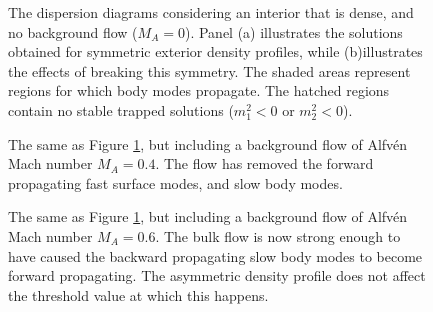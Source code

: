 \documentclass[12pt]{ociamthesis}
\begin{document}
\begin{figure}[t]
\centering
{}
\caption{The dispersion diagrams considering an interior that is dense, and no background flow ($M_A = 0$).
Panel (a) illustrates the solutions obtained for symmetric exterior density profiles, while (b)illustrates the effects of breaking this symmetry.
The shaded areas represent regions for which body modes propagate.
The hatched regions contain no stable trapped solutions ($m_1^2 < 0$ or $m_2^2 < 0$).}
\label{fig:dense0}
\end{figure}

\begin{figure}[t]
\centering
{}
\caption{The same as Figure \ref{fig:dense0}, but including a background flow of Alfv\'en Mach number $M_A = 0.4$.
The flow has removed the forward propagating fast surface modes, and slow body modes.}
\label{fig:dense1}
\end{figure}

\begin{figure}[t]
\centering
{}
\caption{The same as Figure \ref{fig:dense0}, but including a background flow of Alfv\'en Mach number $M_A = 0.6$.
The bulk flow is now strong enough to have caused the backward propagating slow body modes to become forward propagating.
The asymmetric density profile does not affect the threshold value at which this happens.}
\label{fig:dense2}
\end{figure}
\end{document}
